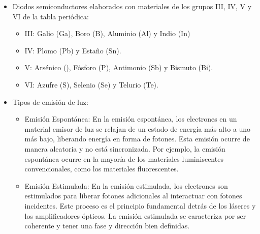 \documentclass[
	12pt, %
	fleqn, %
	a4paper, %
	oneside, %
]{LegrandOrangeBook}
\begin{document}
\begin{itemize}
\item Diodos semiconductores elaborados con materiales de los grupos III, IV, V y VI de la tabla periódica:
\begin{itemize}
\item III: Galio (Ga), Boro (B), Aluminio (Al) y Indio (In)
\item IV: Plomo (Pb) y Estaño (Sn).
\item V: Arsénico (), Fósforo (P), Antimonio (Sb) y Bismuto (Bi).
\item VI: Azufre (S), Selenio (Se) y Telurio (Te).
\end{itemize}
\item Tipos de emisión de luz:
\begin{itemize}
\item Emisión Espontánea: En la emisión espontánea, los electrones en un material emisor de luz se relajan de un estado de energía más alto a uno más bajo, liberando energía en forma de fotones. Esta emisión ocurre de manera aleatoria y no está sincronizada. Por ejemplo, la emisión espontánea ocurre en la mayoría de los materiales luminiscentes convencionales, como los materiales fluorescentes.
\item Emisión Estimulada: En la emisión estimulada, los electrones son estimulados para liberar fotones adicionales al interactuar con fotones incidentes. Este proceso es el principio fundamental detrás de los láseres y los amplificadores ópticos. La emisión estimulada se caracteriza por ser coherente y tener una fase y dirección bien definidas.
\end{itemize}
\end{itemize}
\end{document}
